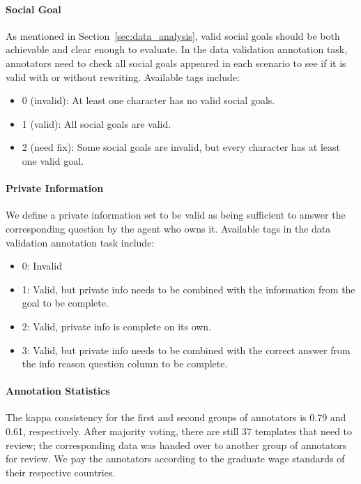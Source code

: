 \paragraph{Social Goal}
As mentioned in Section~\ref{sec:data_analysis}, valid social goals should be both achievable and clear enough to evaluate.
In the data validation annotation task, annotators need to check all social goals appeared in each scenario to see if it is valid with or without rewriting.
Available tags include:

\begin{itemize}
    \item 0 (invalid): At least one character has no valid social goals.
    \item 1 (valid): All social goals are valid.
    \item 2 (need fix): Some social goals are invalid, but every character has at least one valid goal.
\end{itemize}

\paragraph{Private Information}
We define a private information set to be valid as being sufficient to answer the corresponding question by the agent who owns it.
Available tags in the data validation annotation task include:

\begin{itemize}
    \item 0: Invalid
    \item 1: Valid, but private info needs to be combined with the information from the goal to be complete.
    \item 2: Valid, private info is complete on its own.
    \item 3: Valid, but private info needs to be combined with the correct answer from the info reason question column to be complete.
\end{itemize}

\paragraph{Annotation Statistics}
The kappa consistency for the first and second groups of annotators is 0.79 and 0.61, respectively.
After majority voting, there are still 37 templates that need to review;
the corresponding data was handed over to another group of annotators for review. We pay the annotators according to the graduate wage standards of their respective countries.